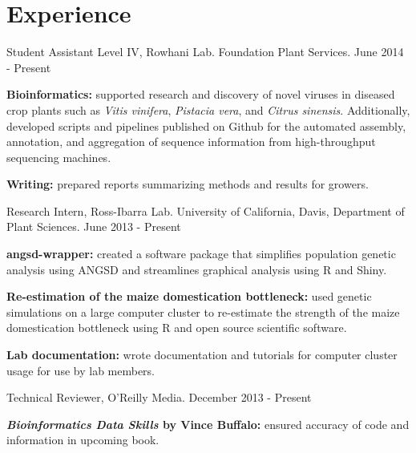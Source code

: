 \documentclass[letterpaper]{article}
\renewenvironment{itemize}{
  \begin{list}{}{
    \setlength{\leftmargin}{1.5em}
  }
}{
  \end{list}
}
\begin{document}
\section*{Experience}
\begin{itemize}
\item Student Assistant Level IV, Rowhani Lab. Foundation Plant Services. \hfill June 2014 - Present
	\begin{itemize}
	\item \textbf{Bioinformatics:} supported research and discovery of novel viruses in diseased crop plants such as \textit{Vitis vinifera}, \textit{Pistacia vera}, and \textit{Citrus sinensis}. Additionally, developed scripts and pipelines published on Github for the automated assembly, annotation, and aggregation of sequence information from high-throughput sequencing machines.
	\item \textbf{Writing:} prepared reports summarizing methods and results for growers.
	\end{itemize}
\item Research Intern, Ross-Ibarra Lab. University of California, Davis, Department of Plant Sciences. \hfill June 2013 - Present
	\begin{itemize}
	\item \textbf{angsd-wrapper:} created a software package that simplifies population genetic analysis using ANGSD and streamlines graphical analysis using R and Shiny.
	\item \textbf{Re-estimation of the maize domestication bottleneck:} used genetic simulations on a large computer cluster to re-estimate the strength of the maize domestication bottleneck using R and open source scientific software.
	\item \textbf{Lab documentation:} wrote documentation and tutorials for computer cluster usage for use by lab members. 
	\end{itemize}
\item Technical Reviewer, O'Reilly Media. \hfill December 2013 - Present
	\begin{itemize}
	\item \textbf{\textit{Bioinformatics Data Skills} by Vince Buffalo:} ensured accuracy of code and information in upcoming book.

\end{itemize}
\end{itemize}
\end{document}

